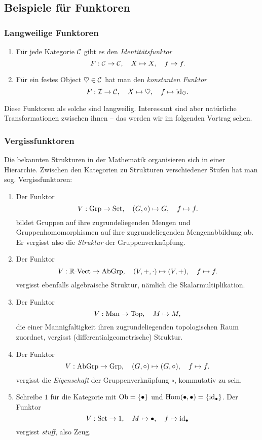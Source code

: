 \subsection{Beispiele für Funktoren}

\subsubsection{Langweilige Funktoren}

\begin{enumerate}
  \item Für jede Kategorie $\mathcal{C}$ gibt es den \emph{Identitätsfunktor}
  \[ F : \mathcal{C} \to \mathcal{C}, \quad X \mapsto X, \quad f \mapsto f. \]
  \item Für ein festes Object $\heartsuit \in \mathcal{C}$ hat man den \emph{konstanten Funktor}
  \[ F : \mathcal{I} \to \mathcal{C}, \quad X \mapsto \heartsuit, \quad f \mapsto \mathrm{id}_\heartsuit. \]
\end{enumerate}

Diese Funktoren als solche sind langweilig. Interessant sind aber natürliche
Transformationen zwischen ihnen -- das werden wir im folgenden Vortrag sehen.


\subsubsection{Vergissfunktoren}

Die bekannten Strukturen in der Mathematik organisieren sich in einer
Hierarchie. Zwischen den Kategorien zu Strukturen verschiedener Stufen hat man sog.
Vergissfunktoren:

\begin{enumerate}
  \item Der Funktor
  \[ V : \mathrm{Grp} \to \mathrm{Set}, \quad (G,\circ) \mapsto G, \quad f \mapsto f. \]
  bildet Gruppen auf ihre zugrundeliegenden Mengen und Gruppenhomomorphismen
  auf ihre zugrundeliegenden Mengenabbildung ab. Er vergisst also die
  \emph{Struktur} der Gruppenverknüpfung.
  \item Der Funktor
  \[ V : {\mathbb{R}\text{-}\mathrm{Vect}} \to \mathrm{AbGrp}, \quad (V,+,\cdot) \mapsto (V,+), \quad f \mapsto f. \]
  vergisst ebenfalls algebraische Struktur, nämlich die Skalarmultiplikation.
  \item Der Funktor
  \[ V : \mathrm{Man} \to \mathrm{Top}, \quad M \mapsto M, \]
  die einer Mannigfaltigkeit ihren zugrundeliegenden topologischen Raum
  zuordnet, vergisst (differentialgeometrische) Struktur.
  \item Der Funktor
  \[ V : \mathrm{AbGrp} \to \mathrm{Grp}, \quad (G,\circ) \mapsto (G,\circ), \quad f \mapsto f. \]
  vergisst die \emph{Eigenschaft} der Gruppenverknüpfung $\circ$, kommutativ zu sein.
  \item Schreibe $1$ für die Kategorie mit $\operatorname{Ob} = \lbrace \bullet \rbrace$ und $\mathrm{Hom}(\bullet,\bullet) = \lbrace \mathrm{id}_\bullet \rbrace$. Der Funktor
  \[ V : \mathrm{Set} \to 1, \quad M \mapsto \bullet, \quad f \mapsto \mathrm{id}_\bullet \]
  vergisst \emph{stuff}, also Zeug.
\end{enumerate}

